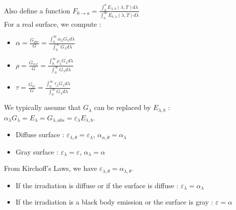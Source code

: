 \documentclass[../main.tex]{subfiles}
\begin{document}
Also define a function $F_{0\rightarrow a} = \frac{\int_0^a E_{\lambda,b}(\lambda, T)d\lambda}{\int_0^\infty E_{b,\lambda}(\lambda,T)d\lambda}$\\

For a real surface, we compute : \begin{itemize}
    \item $\alpha = \frac{G_{abs}}{G} = \frac{\int_0^\infty \alpha_\lambda G_\lambda d\lambda}{\int_0^\infty G_\lambda d\lambda}$\\
    \item $\rho = \frac{G_{ref}}{G} = \frac{\int_0^\infty \rho_\lambda G_\lambda d\lambda}{\int_0^\infty G_\lambda d\lambda}$\\
    \item $\tau = \frac{G_{tr}}{G} = \frac{\int_0^\infty \tau_\lambda G_\lambda d\lambda}{\int_0^\infty G_\lambda d\lambda}$\\
\end{itemize}

We typically assume that $G_\lambda$ can be replaced by $E_{\lambda, b}$ : $\alpha_\lambda G_\lambda = E_\lambda = G_{\lambda, abs} = \varepsilon_{\lambda} E_{\lambda,b}$.\\

\begin{itemize}
    \item Diffuse surface : $\varepsilon_{\lambda,\theta} = \varepsilon_\lambda$, $\alpha_{\alpha,\theta} = \alpha_\lambda$\\
    \item Gray surface : $\varepsilon_\lambda = \varepsilon$, $\alpha_\lambda = \alpha$\\
\end{itemize}

From Kirchoff's Laws, we have $\varepsilon_{\lambda,\theta} = \alpha_{\lambda,\theta}$.\\

\begin{itemize}
    \item If the irradiation is diffuse or if the surface is diffuse : $\varepsilon_\lambda = \alpha_\lambda$\\
    \item If the irradiation is a black body emission or the surface is gray : $\varepsilon = \alpha$\\
\end{itemize}
\end{document}

